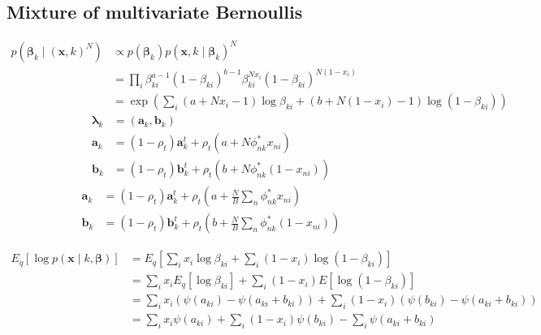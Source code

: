 \documentclass[a4paper]{article}
\begin{document}
		\subsection*{Mixture of multivariate Bernoullis}
			\begin{align}
				p(\bm{\beta}_k \mid (\mathbf{x}, k)^N )
				&\propto p(\bm{\beta}_k) p(\mathbf{x}, k \mid \bm{\beta}_k)^N \\
				&= \prod_i \beta_{ki}^{a - 1}(1 - \beta_{ki})^{b - 1} \beta_{ki}^{Nx_i} (1 - \beta_{ki})^{N(1 - x_i)} \\
				&= \exp\left( \sum_i (a + N x_i - 1) \log \beta_{ki} + (b + N(1 - x_i) - 1) \log(1 - \beta_{ki}) \right)
			\end{align}
			\begin{align}
				\bm{\lambda}_k &= (\mathbf{a}_k, \mathbf{b}_k) \\
				\mathbf{a}_k &= (1 - \rho_t) \mathbf{a}_k^t + \rho_t (a + N \phi_{nk}^* x_{ni}) \\
				\mathbf{b}_k &= (1 - \rho_t) \mathbf{b}_k^t + \rho_t (b + N \phi_{nk}^* (1 - x_{ni}))
			\end{align}
			\begin{align}
				\mathbf{a}_k &= (1 - \rho_t) \mathbf{a}_k^t + \rho_t \left(a + \frac{N}{B} \sum_n \phi_{nk}^* x_{ni}\right) \\
				\mathbf{b}_k &= (1 - \rho_t) \mathbf{b}_k^t + \rho_t \left(b + \frac{N}{B} \sum_n \phi_{nk}^* (1 - x_{ni})\right)
			\end{align}

			\begin{align}
				E_q\left[ \log p(\mathbf{x} \mid k, \bm{\beta}) \right]
				&= E_q\left[ \sum_i x_i \log \beta_{ki} + \sum_i (1 - x_i) \log (1 - \beta_{ki}) \right] \\
				&= \sum_i x_i E_q\left[ \log \beta_{ki} \right] + \sum_i (1 - x_i) E\left[ \log (1 - \beta_{ki})  \right] \\
				&= \sum_i x_i \left( \psi(a_{ki}) - \psi(a_{ki} + b_{ki}) \right) + \sum_i (1 - x_i) \left( \psi(b_{ki}) - \psi(a_{ki} + b_{ki}) \right) \\
				&= \sum_i x_i \psi(a_{ki}) + \sum_i (1 - x_i) \psi(b_{ki}) - \sum_i \psi(a_{ki} + b_{ki})
			\end{align}
\end{document}

